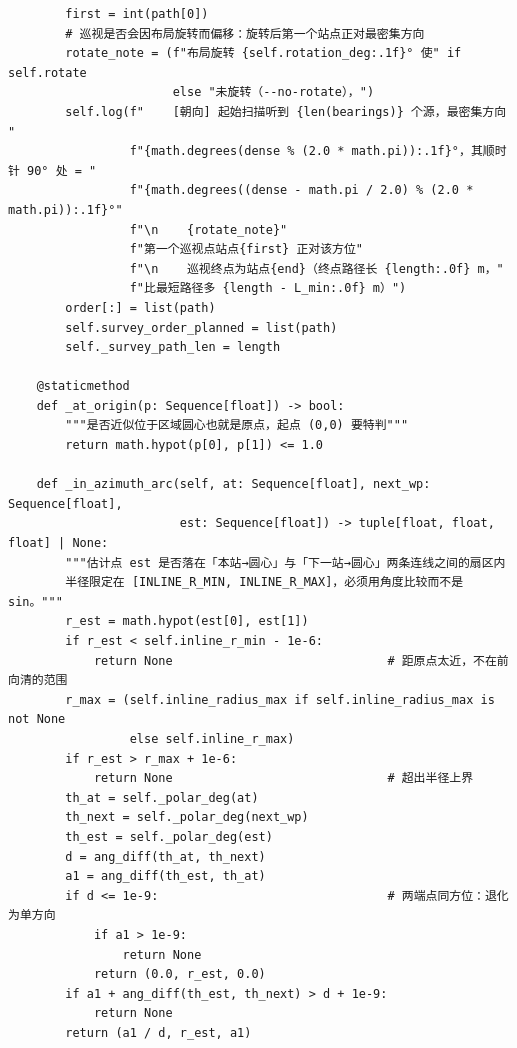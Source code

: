 \documentclass[UTF8, zihao=5,AutoFakeBold=2]{ctexart}
\begin{document}
\begin{lstlisting}
        first = int(path[0])
        # 巡视是否会因布局旋转而偏移：旋转后第一个站点正对最密集方向
        rotate_note = (f"布局旋转 {self.rotation_deg:.1f}° 使" if self.rotate
                       else "未旋转（--no-rotate），")
        self.log(f"    [朝向] 起始扫描听到 {len(bearings)} 个源，最密集方向 "
                 f"{math.degrees(dense % (2.0 * math.pi)):.1f}°，其顺时针 90° 处 = "
                 f"{math.degrees((dense - math.pi / 2.0) % (2.0 * math.pi)):.1f}°"
                 f"\n    {rotate_note}"
                 f"第一个巡视点站点{first} 正对该方位"
                 f"\n    巡视终点为站点{end}（终点路径长 {length:.0f} m，"
                 f"比最短路径多 {length - L_min:.0f} m）")
        order[:] = list(path)
        self.survey_order_planned = list(path)
        self._survey_path_len = length

    @staticmethod
    def _at_origin(p: Sequence[float]) -> bool:
        """是否近似位于区域圆心也就是原点，起点 (0,0) 要特判"""
        return math.hypot(p[0], p[1]) <= 1.0

    def _in_azimuth_arc(self, at: Sequence[float], next_wp: Sequence[float],
                        est: Sequence[float]) -> tuple[float, float, float] | None:
        """估计点 est 是否落在「本站→圆心」与「下一站→圆心」两条连线之间的扇区内
        半径限定在 [INLINE_R_MIN, INLINE_R_MAX]，必须用角度比较而不是 sin。"""
        r_est = math.hypot(est[0], est[1])
        if r_est < self.inline_r_min - 1e-6:
            return None                              # 距原点太近，不在前向清的范围
        r_max = (self.inline_radius_max if self.inline_radius_max is not None
                 else self.inline_r_max)
        if r_est > r_max + 1e-6:
            return None                              # 超出半径上界
        th_at = self._polar_deg(at)
        th_next = self._polar_deg(next_wp)
        th_est = self._polar_deg(est)
        d = ang_diff(th_at, th_next)
        a1 = ang_diff(th_est, th_at)
        if d <= 1e-9:                                # 两端点同方位：退化为单方向
            if a1 > 1e-9:
                return None
            return (0.0, r_est, 0.0)
        if a1 + ang_diff(th_est, th_next) > d + 1e-9:
            return None
        return (a1 / d, r_est, a1)


\end{lstlisting}
\end{document}
